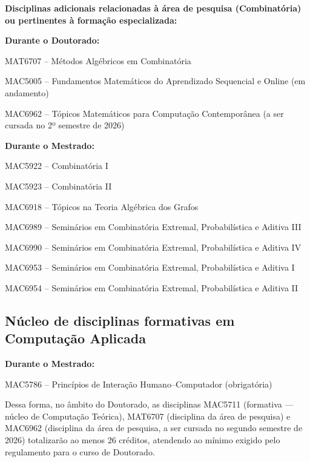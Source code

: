 \documentclass[reqno, 12pt]{amsart}
\newenvironment{packed_itemize}{
\begin{itemize}
  \setlength{\itemsep}{2pt}
  \setlength{\parskip}{0pt}
  \setlength{\parsep}{0pt}
}{\end{itemize}}
\begin{document}
\textbf{Disciplinas adicionais relacionadas à área de pesquisa (Combinatória) ou pertinentes à formação especializada:}

\textbf{Durante o Doutorado:}
\begin{packed_itemize}
  \item MAT6707 -- Métodos Algébricos em Combinatória
  \item MAC5005 -- Fundamentos Matemáticos do Aprendizado Sequencial e Online (em andamento)
  \item MAC6962 -- Tópicos Matemáticos para Computação Contemporânea (a ser cursada no 2º semestre de 2026)
\end{packed_itemize}

\textbf{Durante o Mestrado:}
\begin{packed_itemize}
  \item MAC5922 -- Combinatória I
  \item MAC5923 -- Combinatória II
  \item MAC6918 -- Tópicos na Teoria Algébrica dos Grafos
  \item MAC6989 -- Seminários em Combinatória Extremal, Probabilística e Aditiva III
  \item MAC6990 -- Seminários em Combinatória Extremal, Probabilística e Aditiva IV
  \item MAC6953 -- Seminários em Combinatória Extremal, Probabilística e Aditiva I
  \item MAC6954 -- Seminários em Combinatória Extremal, Probabilística e Aditiva II
\end{packed_itemize}

\subsection{ Núcleo de disciplinas formativas em Computação Aplicada} 

\textbf{Durante o Mestrado:}
\begin{packed_itemize}
  \item MAC5786 -- Princípios de Interação Humano--Computador (obrigatória)
\end{packed_itemize}

Dessa forma, no âmbito do Doutorado, as disciplinas MAC5711 (formativa — núcleo de Computação Teórica), MAT6707 (disciplina da área de pesquisa) e MAC6962 (disciplina da área de pesquisa, a ser cursada no segundo semestre de 2026) totalizarão ao menos 26 créditos, atendendo ao mínimo exigido pelo regulamento para o curso de Doutorado.
\end{document}
